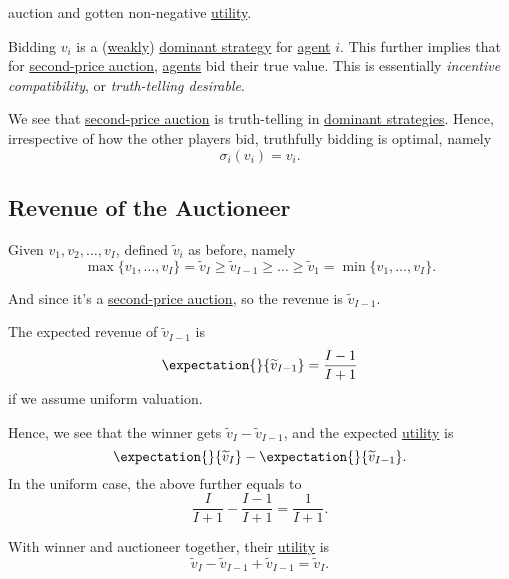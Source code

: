 \begin{itemize}
\begin{enumerate}
			      auction and gotten non-negative \hyperref[def:reward]{utility}.
	      \end{enumerate}
	      \begin{remark}\label{rmk:incentive-compatible}
		      Bidding \(v_i\) is a (\hyperref[def:weakly-dominant-strategy]{weakly}) \hyperref[def:dominant-strategy]{dominant strategy} for
		      \hyperref[def:player]{agent} \(i\). This further implies that for \hyperref[eg:second-price-auction]{second-price auction}, \hyperref[def:player]{agents} bid their true value.
		      This is essentially \emph{incentive compatibility}, or \emph{truth-telling desirable}.
	      \end{remark}
\end{itemize}

\begin{remark}
	We see that \hyperref[eg:second-price-auction]{second-price auction} is truth-telling in \hyperref[def:dominant-strategy]{dominant strategies}.
	Hence, irrespective of how the other players bid, truthfully bidding is optimal, namely
	\[
		\sigma_{i}(v_{i}) = v_{i}.
	\]
\end{remark}

\subsection{Revenue of the Auctioneer}
Given \(v_1, v_2, \ldots , v_I\), defined \(\widetilde{v}_i\) as before, namely
\[
	\max\{v_1, \ldots , v_I\} = \widetilde{v}_{I}\geq \widetilde{v}_{I-1}\geq \ldots \geq \widetilde{v}_1 = \min\{v_1, \ldots , v_I\}.
\]

And since it's a \hyperref[eg:second-price-auction]{second-price auction}, so the revenue is \(\widetilde{v}_{I - 1}\).

\begin{note}
	The expected revenue of \(\widetilde{v}_{I - 1}\) is
	\[
		\expectation{}{\widetilde{v}_{I-1}} = \frac{I-1}{I+1}
	\]
	if we assume uniform valuation.
\end{note}

Hence, we see that the winner gets \(\widetilde{v}_{I} - \widetilde{v}_{I-1}\), and the expected \hyperref[def:reward]{utility}  is
\[
	\expectation{}{\widetilde{v}_{I}} - \expectation{}{\widetilde{v}_{I - 1}}.
\]
In the uniform case, the above further equals to
\[
	\frac{I}{I+1} - \frac{I - 1}{I + 1} = \frac{1}{I+1}.
\]

With winner and auctioneer together, their \hyperref[def:reward]{utility}  is
\[
	\widetilde{v}_{I} - \widetilde{v}_{I - 1}+\widetilde{v}_{I - 1} = \widetilde{v}_{I}.
\]

